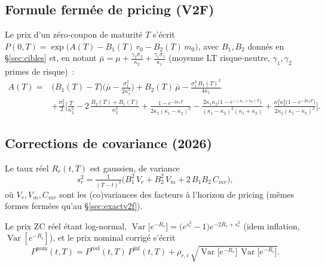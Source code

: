 \documentclass[11pt,a4paper]{article}
\begin{document}
\subsection{Formule fermée de pricing (V2F)}
\begin{definitionbox}
Le prix d'un zéro-coupon de maturité $T$ s'écrit $P(0,T)=\exp\!\big(A(T)-B_1(T)\,r_0-B_2(T)\,m_0\big)$, avec $B_1,B_2$ donnés en \S\ref{sec:cibles} et, en notant $\bar\mu=\mu+\tfrac{\gamma_2\sigma_2}{\kappa_2}+\tfrac{\gamma_1\sigma_1}{\kappa_1}$ (moyenne LT risque-neutre, $\gamma_1,\gamma_2$ primes de risque)~:
{\small
\[
\begin{aligned}
A(T)={}&\big(B_1(T)-T\big)\Big(\bar\mu-\tfrac{\sigma_1^2}{2\kappa_1^2}\Big)+B_2(T)\,\bar\mu-\tfrac{\sigma_1^2\,B_1(T)^2}{4\kappa_1}\\
&+\tfrac{\sigma_2^2}{2}\bigg[\tfrac{T}{\kappa_2^2}-2\,\tfrac{B_2(T)+B_1(T)}{\kappa_2^2}+\tfrac{1-e^{-2\kappa_1 T}}{2\kappa_1(\kappa_1-\kappa_2)^2}
-\tfrac{2\kappa_1\kappa_2\big(1-e^{-(\kappa_1+\kappa_2)T}\big)}{(\kappa_1-\kappa_2)^2(\kappa_1+\kappa_2)}+\tfrac{\kappa_1^2\kappa_2^2\big(1-e^{-2\kappa_2 T}\big)}{2\kappa_2(\kappa_1-\kappa_2)^2}\bigg].
\end{aligned}
\]}
\end{definitionbox}

\subsection{Corrections de covariance (2026)}
\label{sec:corrections}
\begin{definitionbox}
Le taux réel $R_r(t,T)$ est gaussien, de variance
\[
s_r^2=\tfrac{1}{(T-t)^2}\big(B_1^2\,V_r+B_2^2\,V_m+2\,B_1 B_2\,C_{mr}\big),
\]
où $V_r,V_m,C_{mr}$ sont les (co)variances des facteurs à l'horizon de pricing (mêmes formes fermées qu'au \S\ref{sec:exactv2f}).

\medskip
Le prix ZC réel étant log-normal, $\operatorname{Var}\!\big[e^{-R_r}\big]=\big(e^{s_r^2}-1\big)e^{-2\bar R_r+s_r^2}$ (idem inflation, $\operatorname{Var}[e^{-R_i}]$), et le prix nominal corrigé s'écrit
\[
P^{\mathrm{nom}}(t,T)=P^{\mathrm{r\acute eel}}(t,T)\,P^{\mathrm{inf}}(t,T)+\rho_{r,i}\,\sqrt{\operatorname{Var}\!\big[e^{-R_r}\big]\,\operatorname{Var}\!\big[e^{-R_i}\big]}.
\]
\end{definitionbox}
\end{document}
